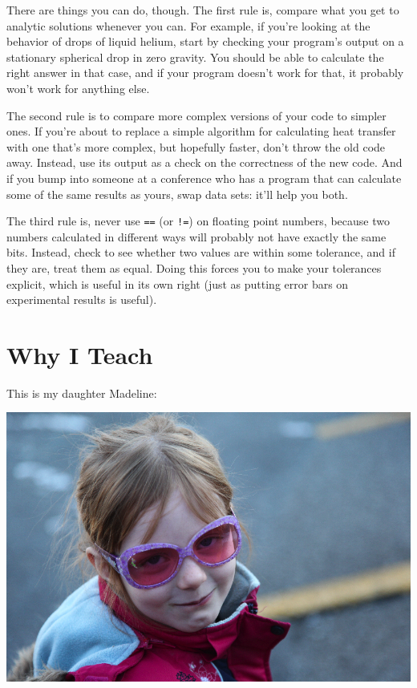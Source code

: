 \documentclass{book}
\begin{document}
There are things you can do, though. The first rule is, compare what you
get to analytic solutions whenever you can. For example, if you're
looking at the behavior of drops of liquid helium, start by checking
your program's output on a stationary spherical drop in zero gravity.
You should be able to calculate the right answer in that case, and if
your program doesn't work for that, it probably won't work for anything
else.

The second rule is to compare more complex versions of your code to
simpler ones. If you're about to replace a simple algorithm for
calculating heat transfer with one that's more complex, but hopefully
faster, don't throw the old code away. Instead, use its output as a
check on the correctness of the new code. And if you bump into someone
at a conference who has a program that can calculate some of the same
results as yours, swap data sets: it'll help you both.

The third rule is, never use \texttt{==} (or \texttt{!=}) on floating
point numbers, because two numbers calculated in different ways will
probably not have exactly the same bits. Instead, check to see whether
two values are within some tolerance, and if they are, treat them as
equal. Doing this forces you to make your tolerances explicit, which is
useful in its own right (just as putting error bars on experimental
results is useful).

\section{Why I Teach}

This is my daughter Madeline:

\includegraphics{novice/extras/img/madeleine.jpg}
\end{document}

